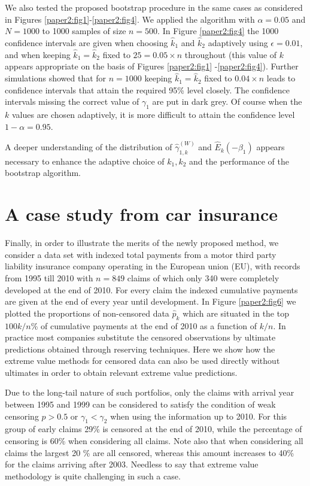 \vspace{0.3cm}
We also tested the proposed bootstrap procedure in the same cases as considered in Figures \ref{paper2:fig1}-\ref{paper2:fig4}. We applied the algorithm with $\alpha=0.05$ and $N=1000$ to 1000 samples of size $n=500$. In Figure \ref{paper2:fig4} the 1000 confidence intervals are given when choosing $\hat{k}_1$ and $\hat{k}_2$ adaptively using $\epsilon=0.01$, and when keeping $\hat{k}_1=\hat{k}_2$ fixed to $25 = 0.05 \times n$ throughout (this value of $k$ appears appropriate on the basis of Figures \ref{paper2:fig1} -\ref{paper2:fig4}). 
Further simulations showed that for $n=1000$ keeping $\hat{k}_1=\hat{k}_2$ fixed to $0.04 \times n$ leads to confidence intervals that attain the required 95\% level closely.
The confidence intervals missing the correct value of $\gamma_1$ are put in dark grey. Of course when the $k$ values are chosen adaptively, it is more difficult to attain the confidence level $1-\alpha = 0.95$.


A deeper understanding of the distribution of $\hat{\gamma}_{1,k}^{(W)}$ and $\hat{E}_k (-\beta_1)$ appears necessary to enhance the adaptive choice of $k_1, k_2$ and the performance of the bootstrap algorithm. 

\section{A case study from car insurance} 
\label{chap4::Sec6}

Finally, in order to illustrate the merits of the newly proposed method, we consider a data set with indexed total payments from a motor third party liability insurance company operating in the European union (EU), with records from 1995 till 2010 with $n=849$ claims of which only 340 were completely developed at the end of 2010. For every claim the indexed cumulative payments are given at the end of every year until development. In Figure \ref{paper2:fig6} we plotted the proportions of non-censored data $\hat{p}_k$ which are situated in the top $100k/n$\% of cumulative payments at the end of 2010 as a function of $k/n$. 
In practice most companies substitute the censored observations by ultimate predictions obtained through reserving techniques. Here we show how the extreme value methods for censored data can also be used directly without ultimates in order to obtain relevant extreme value predictions.

\vspace{0.3cm}
Due to the long-tail nature of such portfolios, only the claims with arrival year between 1995 and 1999 can be considered to satisfy the condition of weak censoring $p > 0.5$ or $\gamma_1 < \gamma_2$ when using the information up to 2010. For this group of early claims 29\% is censored at the end of 2010, while the percentage of censoring is 60\% when considering all claims. Note also that when considering all claims the largest 20 \% are all censored, whereas this amount increases to 40\% for the claims arriving after 2003. Needless to say that extreme value methodology is quite challenging in such a case.

